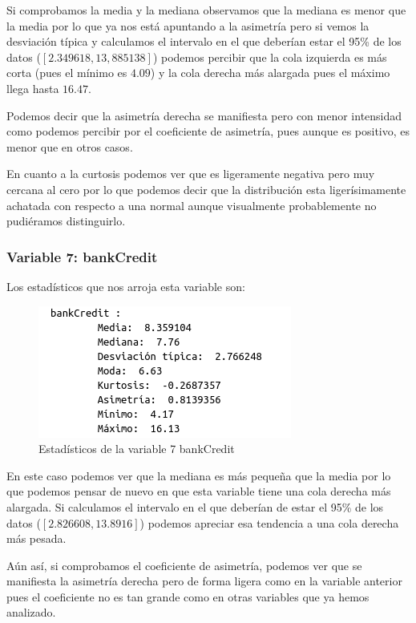 \documentclass[12pt,a4paper]{article}
\begin{document}
Si comprobamos la media y la mediana observamos que la mediana es menor que la media por lo que ya nos está apuntando a la asimetría pero si vemos la desviación típica y calculamos el intervalo en el que deberían estar el 95\% de los datos ($[2.349618, 13,885138]$) podemos percibir que la cola izquierda es más corta (pues el mínimo es $4.09$) y la cola derecha más alargada pues el máximo llega hasta $16.47$.

Podemos decir que la asimetría derecha se manifiesta pero con menor intensidad como podemos percibir por el coeficiente de asimetría, pues aunque es positivo, es menor que en otros casos.

En cuanto a la curtosis podemos ver que es ligeramente negativa pero muy cercana al cero por lo que podemos decir que la distribución esta ligerísimamente achatada con respecto a una normal aunque visualmente probablemente no pudiéramos distinguirlo.

\subsubsection*{Variable 7: bankCredit}

Los estadísticos que nos arroja esta variable son:

\begin{figure}[H]
	\centering
	\includegraphics[scale=0.7]{./Imagenes/EDA/Regresion/estadisticos_bankCredit.png}
	\caption{Estadísticos de la variable 7 bankCredit}
\end{figure}

En este caso podemos ver que la mediana es más pequeña que la media por lo que podemos pensar de nuevo en que esta variable tiene una cola derecha más alargada. Si calculamos el intervalo en el que deberían de estar el 95\% de los datos ($[2.826608,13.8916]$) podemos apreciar esa tendencia a una cola derecha más pesada. 

Aún así, si comprobamos el coeficiente de asimetría, podemos ver que se manifiesta la asimetría derecha pero de forma ligera como en la variable anterior pues el coeficiente no es tan grande como en otras variables que ya hemos analizado. 
\end{document}
